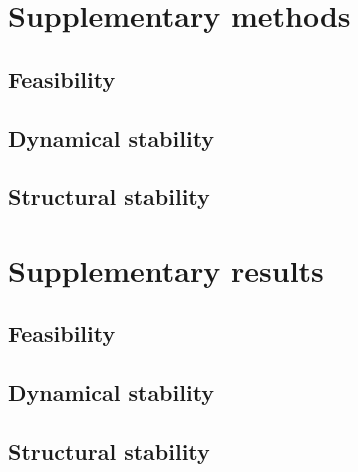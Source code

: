 \documentclass[12pt, titlepage, twoside, openright]{report}
\begin{document}
% 
\section{Supplementary methods}
\subsection{Feasibility}

\subsection{Dynamical stability}

\subsection{Structural stability}

\FloatBarrier
% 
\section{Supplementary results}
\subsection{Feasibility}

\subsection{Dynamical stability}

\subsection{Structural stability}


\FloatBarrier


\end{document}
